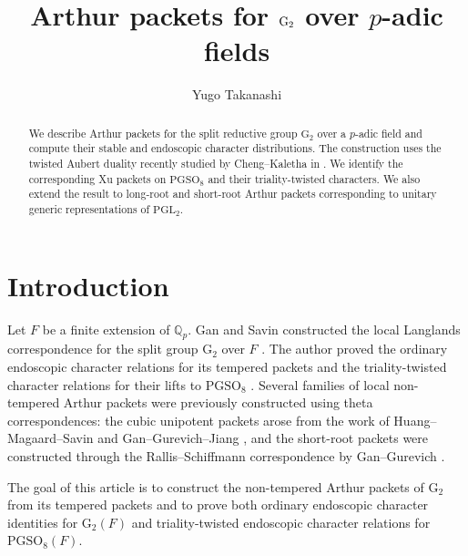 \documentclass[12pt]{amsart}
\title[Arthur packets for $\rG_2$ over $p$-adic fields]{Arthur packets for $\rG_2$ over $p$-adic fields}
\author{Yugo Takanashi}
\date{}
\theoremstyle{definition}
\theoremstyle{plain}
\theoremstyle{remark}
\def\Q{\mathbb{Q}}%
\def\PGL{\mathrm{PGL}}
\def\PGSO{\mathrm{PGSO}}
\numberwithin{equation}{section}
\newcommand{\rG}{\mathrm{G}}
\begin{document}
\begin{abstract}
We describe Arthur packets for the split reductive group $\rG_2$ over a $p$-adic field and compute their stable and endoscopic character distributions.
The construction uses the twisted Aubert duality recently studied by Cheng--Kaletha in \cite{ChengKaletha2026-AubertBernsteinInvolutionsDisconnectedGroups}.
We identify the corresponding Xu packets on $\PGSO_8$ and their triality-twisted characters. 
We also extend the result to long-root and short-root Arthur packets corresponding to unitary generic representations of $\PGL_2$.
\end{abstract}

\maketitle
\setcounter{tocdepth}{1}
\tableofcontents

\section*{Introduction}


Let $F$ be a finite extension of $\Q_p$. 
Gan and Savin constructed the local Langlands correspondence for the split group $\rG_2$ over $F$ \cite{GanSavin2023-LocalLanglandsConjectureG2}. 
The author proved the ordinary endoscopic character relations for its tempered packets and the triality-twisted character relations for their lifts to $\PGSO_8$ \cite{TakanashiEndoscopyLocal}. 
Several families of local non-tempered Arthur packets were previously constructed using theta correspondences:
the cubic unipotent packets arose from the work of Huang--Magaard--Savin \cite{HuangMagaardSavin1998-UnipotentRepresentationsG2} and
Gan--Gurevich--Jiang \cite{GanGurevichJiang2002-CubicUnipotentArthurParameters}, and the short-root packets were constructed through the Rallis--Schiffmann correspondence by Gan--Gurevich \cite{GanGurevich2006-NontemperedAPacketsG2}.

The goal of this article is to construct the non-tempered Arthur
packets of $\rG_2$ from its tempered packets and to prove both ordinary endoscopic character identities for $\rG_2(F)$ and triality-twisted endoscopic character relations for $\PGSO_8(F)$.
\end{document}
